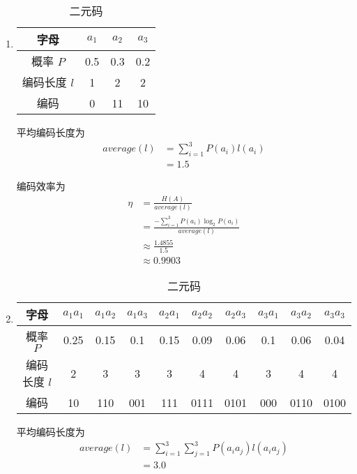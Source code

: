 \documentclass{ctexart}
\begin{document}
\begin{enumerate}
    \item\begin{table}[H]
        \centering
        \caption{二元码}
        \begin{tabular}{c|c|c|c}
            \hline
            字母 & $a_1$ & $a_2$ & $a_3$ \\
            \hline
            概率 $P$ & 0.5 & 0.3 & 0.2 \\
            编码长度 $l$ & 1 & 2 & 2 \\
            编码 & 0 & 11 & 10 \\
            \hline
        \end{tabular}
    \end{table}

    平均编码长度为
    \begin{align}
        average(l) &= \sum_{i=1}^3 P(a_i)l(a_i) \\
        &= 1.5
    \end{align}

    编码效率为
    \begin{align}
        \eta &= \frac{H(A)}{average(l)} \\
        &= \frac{-\sum_{i=1}^3 P(a_i)\log_2 P(a_i)}{average(l)} \\
        &\approx \frac{1.4855}{1.5} \\
        &\approx 0.9903
    \end{align}

    \item\begin{table}[H]
        \centering
        \caption{二元码}
        \begin{tabular}{c|c|c|c|c|c|c|c|c|c}
            \hline
            字母 & $a_1a_1$ & $a_1a_2$ & $a_1a_3$ & $a_2a_1$ & $a_2a_2$ & $a_2a_3$ & $a_3a_1$ & $a_3a_2$ & $a_3a_3$ \\
            \hline
            概率 $P$ & 0.25 & 0.15 & 0.1 & 0.15 & 0.09 & 0.06 & 0.1 & 0.06 & 0.04 \\
            编码长度 $l$ & 2 & 3 & 3 & 3 & 4 & 4 & 3 & 4 & 4 \\
            编码 & 10 & 110 & 001 & 111 & 0111 & 0101 & 000 & 0110 & 0100 \\
            \hline
        \end{tabular}
    \end{table}

    平均编码长度为
    \begin{align}
        average(l) &= \sum_{i=1}^3\sum_{j=1}^3 P(a_ia_j)l(a_ia_j) \\
        &= 3.0
    \end{align}


\end{enumerate}
\end{document}
